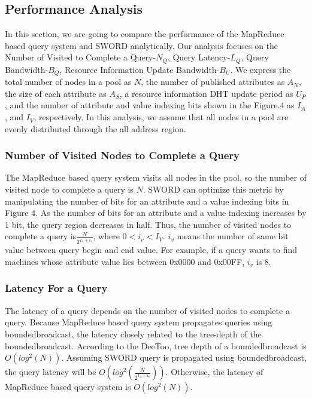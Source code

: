 \documentclass{acm_proc_article-sp}
\begin{document}
\subsection{Performance Analysis}
In this section, we are going to compare the performance of the MapReduce based query system and SWORD analytically. 
Our analysis focuses on the Number of Visited to Complete a Query-$N_Q$, Query Latency-$L_Q$, Query Bandwidth-$B_Q$, Resource Information Update Bandwidth-$B_U$.
We express the total number of nodes in a pool as $N$, the number of published attributes as $A_N$, the size of each attribute as $A_S$, a resource information DHT update period as $U_P$, 
and the number of attribute and value indexing bits shown in the Figure.4 as $I_A$, and $I_V$, respectively. In this analysis, we assume that all nodes in a pool are evenly distributed through the all address region.

\subsubsection{Number of Visited Nodes to Complete a Query}
The MapReduce based query system visits all nodes in the pool, so the number of visited node to complete a query is $N$.
SWORD can optimize this metric by manipulating the number of bits for an attribute and a value indexing bits in Figure 4. As the number of bits for an attribute and a value indexing increases by 1 bit, 
the query region decreases in half. Thus, the number of visited nodes to complete a query is\begin{math}\frac{N}{2^{I_A+i_v}}\end{math}, where \begin{math}0<i_v<I_V\end{math}.
\begin{math}i_v\end{math} means the number of same bit value between query begin and end value. For example, if a query wants to find machines whose attribute value lies between 0x0000 and 0x00FF, \begin{math}i_v\end{math} is 8. 
\subsubsection{Latency For a Query}
The latency of a query depends on the number of visited nodes to complete a query. Because MapReduce based query system propagates queries using boundedbroadcast, the latency closely related to
the tree-depth of the boundedbroadcast. According to the DeeToo\cite{deetoo}, tree depth of a boundedbroadcast is \begin{math}O(log^2(N))\end{math}. Assuming SWORD query is propagated using boundedbroadcast,
the query latency will be  \begin{math}O(log^2(\frac{N}{2^{I_A+i_v}}))\end{math}. Otherwise, the latency of MapReduce based query system is  \begin{math}O(log^2(N))\end{math}.
\end{document}
